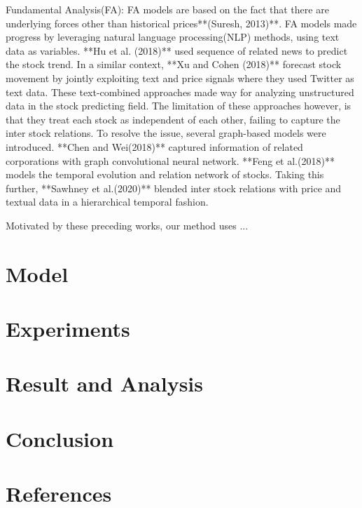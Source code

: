 \documentclass[11pt, oneside, twocolumn]{article}   	%
\begin{document}
Fundamental Analysis(FA): FA models are based on the fact that there are underlying forces other than historical prices**(Suresh, 2013)**. FA models made progress by leveraging natural language processing(NLP) methods, using text data as variables. **Hu et al. (2018)** used sequence of related news to predict the stock trend. In a similar context, **Xu and Cohen (2018)** forecast stock movement by jointly exploiting text and price signals where they used Twitter as text data. These text-combined approaches made way for analyzing unstructured data in the stock predicting field. The limitation of these approaches however, is that they treat each stock as independent of each other, failing to capture the inter stock relations. To resolve the issue, several graph-based models were introduced. **Chen and Wei(2018)** captured information of related corporations with graph convolutional neural network. **Feng et al.(2018)** models the temporal evolution and relation network of stocks. Taking this further, **Sawhney et al.(2020)** blended inter stock relations with price and textual data in a hierarchical temporal fashion. 

Motivated by these preceding works, our method uses ...
\section{Model}
\section{Experiments}
\section{Result and Analysis}
\section{Conclusion}
\section{References}

\end{document}
